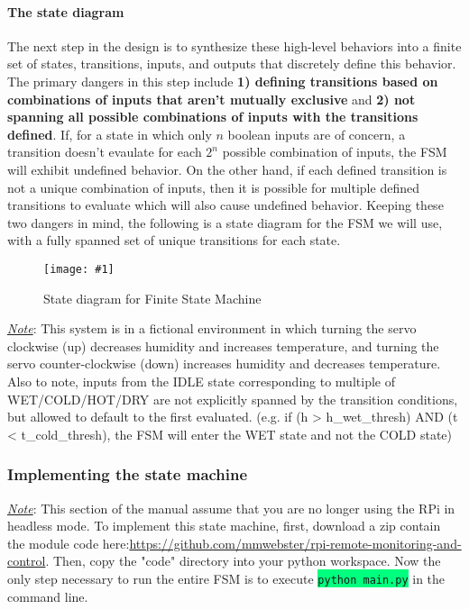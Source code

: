 \documentclass{article}
\newcommand{\codei}[1]{\colorbox{SpringGreen}{\texttt{#1}}} %
\newcommand{\imagefigb}[2]{
    \begin{figure}[H]
        \centering
        \texttt{[image: \#1]}
        \caption{#2}
    \end{figure}
}
\newcommand{\note}[1]{\underline{\textit{Note}}: #1}
\begin{document}
    \paragraph{The state diagram}
      The next step in the design is to synthesize these high-level behaviors into a finite set of states, transitions, inputs, and outputs that discretely define this behavior. The primary dangers in this step include \textbf{1) defining transitions based on combinations of inputs that aren't mutually exclusive} and \textbf{2) not spanning all possible combinations of inputs with the transitions defined}. If, for a state in which only $n$ boolean inputs are of concern, a transition doesn't evaulate for each $2^n$ possible combination of inputs, the FSM will exhibit undefined behavior. On the other hand, if each defined transition is not a unique combination of inputs, then it is possible for multiple defined transitions to evaluate which will also cause undefined behavior. Keeping these two dangers in mind, the following is a state diagram for the FSM we will use, with a fully spanned set of unique transitions for each state.
      \imagefigb{fsm-slab.png}{State diagram for Finite State Machine}
      \noindent
      \note{This system is in a fictional environment in which turning the servo clockwise (up) decreases humidity and increases temperature, and turning the servo counter-clockwise (down) increases humidity and decreases temperature. Also to note, inputs from the IDLE state corresponding to multiple of WET/COLD/HOT/DRY are not explicitly spanned by the transition conditions, but allowed to default to the first evaluated. (e.g. if (h > h\_wet\_thresh) AND (t < t\_cold\_thresh), the FSM will enter the WET state and not the COLD state)}
  \subsubsection{Implementing the state machine}
    \underline{\textit{Note}}: This section of the manual assume that you are no longer using the RPi in headless mode.
    \newline\newline \noindent
    To implement this state machine, first, download a zip contain the module code here:\newline \href{https://github.com/mmwebster/rpi-remote-monitoring-and-control}{https://github.com/mmwebster/rpi-remote-monitoring-and-control}. Then, copy the "code" directory into your python workspace. Now the only step necessary to run the entire FSM is to execute \codei{python main.py} in the command line.
\end{document}
